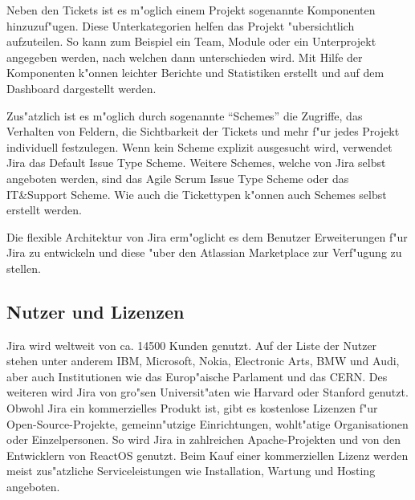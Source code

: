 Neben den Tickets ist es m"oglich einem Projekt sogenannte Komponenten hinzuzuf"ugen. Diese Unterkategorien helfen das Projekt "ubersichtlich aufzuteilen. So kann zum Beispiel ein Team, Module oder ein Unterprojekt angegeben werden, nach welchen dann unterschieden wird. Mit Hilfe der Komponenten k"onnen leichter Berichte und Statistiken erstellt und auf dem Dashboard dargestellt werden.
 
Zus"atzlich ist es m"oglich durch sogenannte ``Schemes'' die Zugriffe, das Verhalten von Feldern, die Sichtbarkeit der Tickets und mehr f"ur jedes Projekt individuell festzulegen. Wenn kein Scheme explizit ausgesucht wird, verwendet Jira das Default Issue Type Scheme. Weitere Schemes, welche von Jira selbst angeboten werden, sind das Agile Scrum Issue Type Scheme oder das IT\&Support Scheme. Wie auch die Tickettypen k"onnen auch Schemes selbst erstellt werden.

Die flexible Architektur von Jira erm"oglicht es dem Benutzer Erweiterungen f"ur Jira zu entwickeln und diese "uber den Atlassian Marketplace zur Verf"ugung zu stellen.

\subsection{Nutzer und Lizenzen}
Jira wird weltweit  von ca. 14500 Kunden genutzt. Auf der Liste der Nutzer stehen unter anderem IBM, Microsoft, Nokia, Electronic Arts, BMW und Audi, aber auch Institutionen wie das Europ"aische Parlament und das CERN. Des weiteren wird Jira von gro"sen Universit"aten wie Harvard oder Stanford genutzt. Obwohl Jira ein kommerzielles Produkt ist, gibt es kostenlose Lizenzen f"ur Open-Source-Projekte, gemeinn"utzige Einrichtungen, wohlt"atige Organisationen oder Einzelpersonen. So wird Jira in zahlreichen Apache-Projekten und von den Entwicklern von ReactOS genutzt. Beim Kauf einer kommerziellen Lizenz werden meist zus"atzliche Serviceleistungen wie Installation, Wartung und Hosting angeboten.
